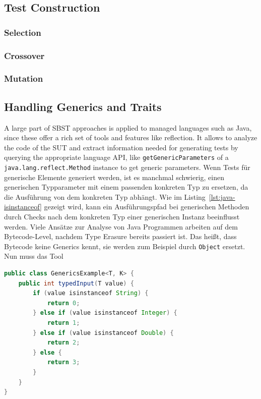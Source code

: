\documentclass{article}
\begin{document}
\subsection{Test Construction}

\subsubsection{Selection}

\subsubsection{Crossover}

\subsubsection{Mutation}


\subsection{Handling Generics and Traits}
A large part of \ac{SBST} approaches is applied to managed languages such as Java, since these offer a rich set of tools and features like reflection. It allows to analyze the code of the \ac{SUT} and extract information needed for generating tests by querying the appropriate language \ac{API}, like \lstinline{getGenericParameters} of a \lstinline{java.lang.reflect.Method} instance to get generic parameters. Wenn Tests für generische Elemente generiert werden, ist es manchmal schwierig, einen generischen Typparameter mit einem passenden konkreten Typ zu ersetzen, da die Ausführung von dem konkreten Typ abhängt. Wie im Listing~\ref{lst:java-isinstanceof} gezeigt wird, kann ein Ausführungspfad bei generischen Methoden durch Checks nach dem konkreten Typ einer generischen Instanz beeinflusst werden. Viele Ansätze zur Analyse von Java Programmen arbeiten auf dem Bytecode-Level, nachdem Type Erasure bereits passiert ist. Das heißt, dass Bytecode keine Generics kennt, sie werden zum Beispiel durch \lstinline{Object} ersetzt. Nun muss das Tool

\begin{lstlisting}[language=Java, style=boxed, caption={The execution path of the generic Java method depends on the concrete type of the argument}, label=lst:java-isinstanceof]
public class GenericsExample<T, K> {
    public int typedInput(T value) {
        if (value isinstanceof String) {
            return 0;
        } else if (value isinstanceof Integer) {
            return 1;
        } else if (value isinstanceof Double) {
            return 2;
        } else {
            return 3;
        }
    }
}
\end{lstlisting}
\end{document}
